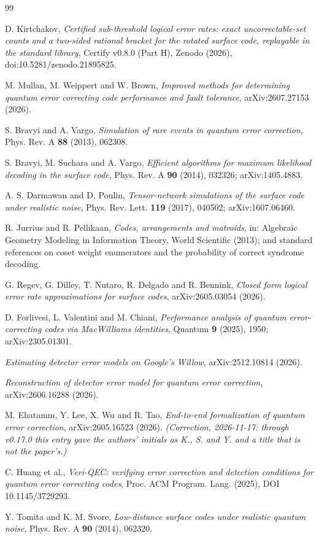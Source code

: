 \documentclass[11pt]{amsart}
\theoremstyle{plain}
\theoremstyle{definition}
\theoremstyle{remark}
\begin{document}
\begin{thebibliography}{99}

 D. Kirtchakov, \emph{Certified sub-threshold logical
error rates: exact uncorrectable-set counts and a two-sided rational bracket
for the rotated surface code, replayable in the standard library}, Certify
v0.8.0 (Part H), Zenodo (2026), doi:10.5281/zenodo.21895825.

 M. Mullan, M. Weippert and W. Brown, \emph{Improved
methods for determining quantum error correcting code performance and fault
tolerance}, arXiv:2607.27153 (2026).

 S. Bravyi and A. Vargo, \emph{Simulation of rare events in
quantum error correction}, Phys. Rev. A \textbf{88} (2013), 062308.

 S. Bravyi, M. Suchara and A. Vargo, \emph{Efficient
algorithms for maximum likelihood decoding in the surface code}, Phys. Rev.
A \textbf{90} (2014), 032326; arXiv:1405.4883.

 A. S. Darmawan and D. Poulin, \emph{Tensor-network
simulations of the surface code under realistic noise}, Phys. Rev. Lett.
\textbf{119} (2017), 040502; arXiv:1607.06460.

 R. Jurrius and R. Pellikaan, \emph{Codes, arrangements and
matroids}, in: Algebraic Geometry Modeling in Information Theory, World
Scientific (2013); and standard references on coset weight enumerators and
the probability of correct syndrome decoding.

 G. Regev, G. Dilley, T. Nutaro, R. Delgado and
R. Bennink, \emph{Closed form logical error rate approximations for surface
codes}, arXiv:2605.03054 (2026).

 D. Forlivesi, L. Valentini and M. Chiani,
\emph{Performance analysis of quantum error-correcting codes via MacWilliams
identities}, Quantum \textbf{9} (2025), 1950; arXiv:2305.01301.

 \emph{Estimating detector error models on Google's
Willow}, arXiv:2512.10814 (2026).

 \emph{Reconstruction of detector error model for
quantum error correction}, arXiv:2606.16288 (2026).

 M. Ehatamm, Y. Lee, X. Wu and R. Tao,
\emph{End-to-end formalization of quantum error correction},
arXiv:2605.16523 (2026). \emph{(Correction, 2026-11-17: through v0.17.0
this entry gave the authors' initials as K., S. and Y. and a title that is
not the paper's.)}

 C. Huang et al., \emph{Veri-QEC: verifying error
correction and detection conditions for quantum error correcting codes},
Proc. ACM Program. Lang. (2025), DOI 10.1145/3729293.

 Y. Tomita and K. M. Svore, \emph{Low-distance surface codes
under realistic quantum noise}, Phys. Rev. A \textbf{90} (2014), 062320.

\end{thebibliography}
\end{document}
